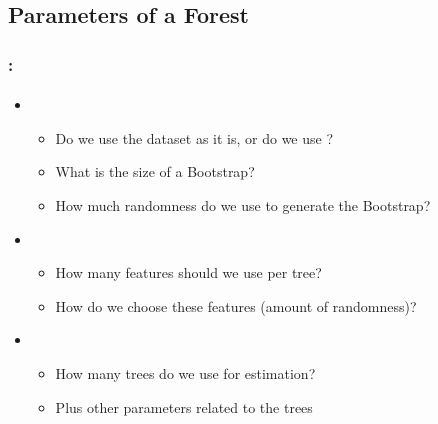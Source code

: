 \documentclass[xcolor=table]{beamer}
\begin{document}
\subsection{Parameters of a Forest}

\begin{frame}
	\frametitle{\insertshortsubtitle: \insertsection}
	\framesubtitle{\insertsubsection}
	
	\begin{itemize}
		\item {}
		\begin{itemize}
			\item Do we use the dataset as it is, or do we use ?
			\item What is the size of a Bootstrap?
			\item How much randomness do we use to generate the Bootstrap?
		\end{itemize}
		\item {}
		\begin{itemize}
			\item How many features should we use per tree?
			\item How do we choose these features (amount of randomness)?
		\end{itemize}
		\item {}
		\begin{itemize}
			\item How many trees do we use for estimation?
			\item Plus other parameters related to the trees
		\end{itemize}
	\end{itemize}
	
\end{frame}


\end{document}
